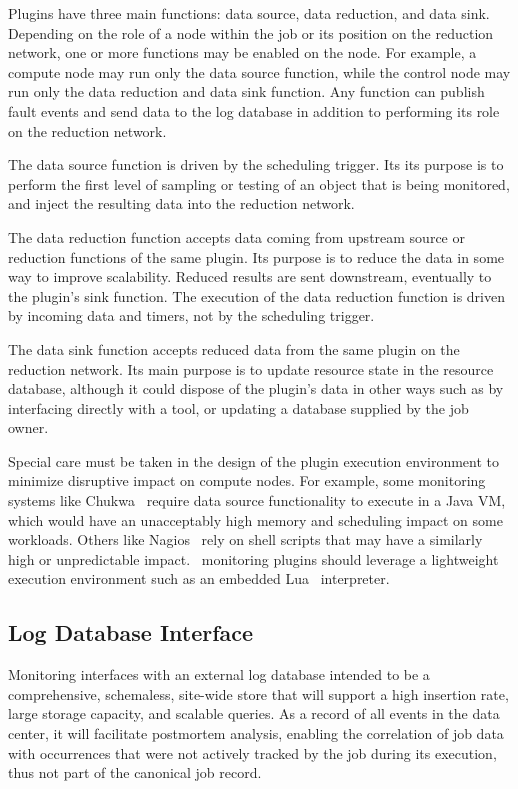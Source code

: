 Plugins have three main functions: data source, data reduction,
and data sink.  Depending on the role of a node within the job or
its position on the reduction network,
one or more functions may be enabled on the node.
For example, a compute node may run only the data source function,
while the control node may run only the data reduction and data sink function.
Any function can publish fault events and send data to the log database
in addition to performing its role on the reduction network.

The data source function is driven by the scheduling trigger.
Its its purpose is to perform the first level of sampling or testing
of an object that is being monitored, and inject the resulting data 
into the reduction network.

The data reduction function accepts data coming from upstream source or
reduction functions of the same plugin.
Its purpose is to reduce the data in some way to improve scalability.
Reduced results are sent downstream, eventually to the plugin's sink function.
The execution of the data reduction function is driven by
incoming data and timers, not by the scheduling trigger.

The data sink function accepts reduced data from the same plugin on
the reduction network.
Its main purpose is to update resource state in the resource database,
although it could dispose of the plugin's data in other ways such as by
interfacing directly with a tool, or updating a database supplied by the
job owner.

Special care must be taken in the design of the plugin execution
environment to minimize disruptive impact on compute nodes.
For example, some monitoring systems like Chukwa~\cite{Chukwa} require
data source functionality to execute in a Java VM, which would have an
unacceptably high memory and scheduling impact on some workloads.
Others like Nagios~\cite{Nagios} rely on shell scripts that may have a
similarly high or unpredictable impact.
\ngrm\ monitoring plugins should leverage a lightweight execution environment
such as an embedded Lua~\cite{LuaBook} interpreter.

\subsection{Log Database Interface}

Monitoring interfaces with an external log database intended to
be a comprehensive, schemaless, site-wide store that will support a
high insertion rate, large storage capacity, and scalable queries.
As a record of all events in the data center, it will facilitate
postmortem analysis, enabling the correlation of job data
with occurrences that were not actively tracked by the job during its
execution, thus not part of the canonical job record.

